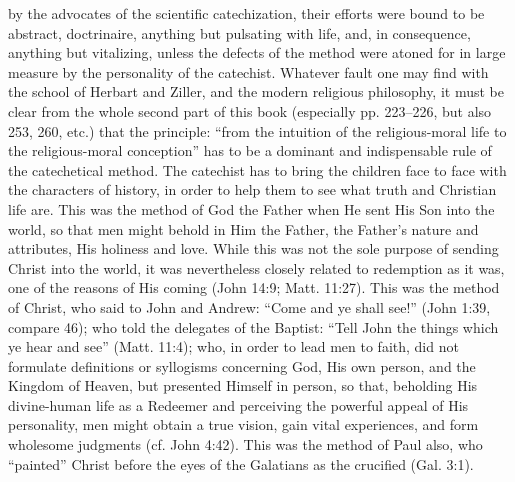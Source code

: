 by the advocates of the scientific catechization, their efforts were bound to be abstract, doctrinaire, anything but pulsating with life, and, in consequence, anything but vitalizing, unless the defects of the method were atoned for in large measure by the personality of the catechist. Whatever fault one may find with the school of Herbart and Ziller, and the modern religious philosophy, it must be clear from the whole second part of this book (especially pp. 223–226, but also 253, 260, etc.) that the principle: “from the intuition of the religious-moral life to the religious-moral conception” has to be a dominant and indispensable rule of the catechetical method. The catechist has to bring the children face to face with the characters of history, in order to help them to see what truth and Christian life are. This was the method of God the Father when He sent His Son into the world, so that men might behold in Him the Father, the Father’s nature and attributes, His holiness and love. While this was not the sole purpose of sending Christ into the world, it was nevertheless closely related to redemption as it was, one of the reasons of His coming (John 14:9; Matt. 11:27). This was the method of Christ, who said to John and Andrew: “Come and ye shall see!” (John 1:39, compare 46); who told the delegates of the Baptist: “Tell John the things which ye hear and see” (Matt. 11:4); who, in order to lead men to faith, did not formulate definitions or syllogisms concerning God, His own person, and the Kingdom of Heaven, but presented Himself in person, so that, beholding His divine-human life as a Redeemer and perceiving the powerful appeal of His personality, men might obtain a true vision, gain vital experiences, and form wholesome judgments (cf. John 4:42). This was the method of Paul also, who “painted” Christ before the eyes of the Galatians as the crucified (Gal. 3:1).

